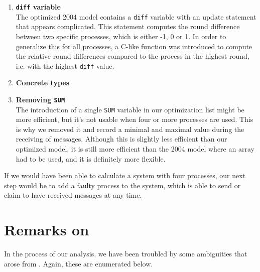 \documentclass[a4paper,10pt]{article}
\begin{document}
\begin{enumerate}
\item \textbf{\texttt{diff} variable} \\
	The optimized 2004 model contains a \texttt{diff} variable with an update statement that appears complicated. This statement computes the round difference between two specific processes, which is either -1, 0 or 1. In order to generalize this for all processes, a C-like function was introduced to compute the relative round differences compared to the process in the highest round, i.e. with the highest \texttt{diff} value.

\item \textbf{Concrete types} \\

\item \textbf{Removing \texttt{SUM}} \\
	The introduction of a single \texttt{SUM} variable in our optimization list might be more efficient, but it's not usable when four or more processes are used. This is why we removed it and record a minimal and maximal value during the receiving of messages. Although this is slightly less efficient than our optimized model, it is still more efficient than the 2004 model where an array had to be used, and it is definitely more flexible.
\end{enumerate}

If we would have been able to calculate a system with four processes, our next step would be to add a faulty process to the system, which is able to send or claim to have received messages at any time.


\section{Remarks on \cite{Aceto2004Notes}\label{sec:remarks}}

In the process of our analysis, we have been troubled by some ambiguities that arose from \cite{Aceto2004Notes}. Again, these are enumerated below.
\end{document}
